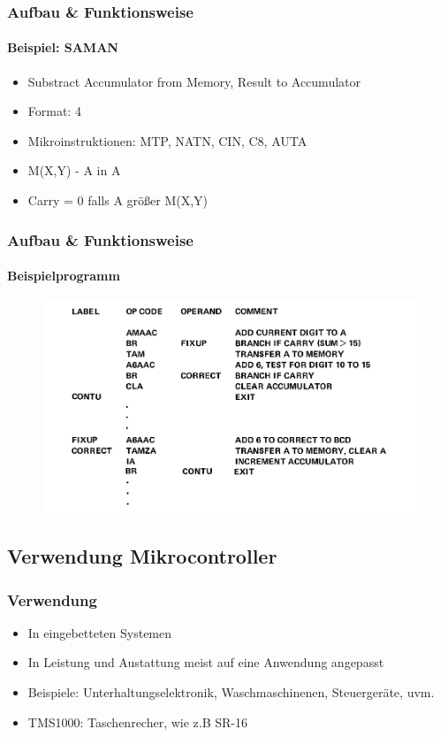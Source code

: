 \begin{frame}
\frametitle{Aufbau \& Funktionsweise}
	\framesubtitle{Beispiel: SAMAN}
		\begin{itemize}
			\item Substract Accumulator from Memory, Result to Accumulator \pause
			\item Format: 4 \pause
			\item Mikroinstruktionen: MTP, NATN, CIN, C8, AUTA \pause
			\item M(X,Y) - A in A \pause
			\item Carry = 0 falls A gr{\"o}{\ss}er M(X,Y)
		\end{itemize}
\end{frame}

\begin{frame}
\frametitle{Aufbau \& Funktionsweise}
	\framesubtitle{Beispielprogramm}
		\begin{figure}
			\centering
				\includegraphics[scale=0.3]{images/BSPProg.PNG}
		\end{figure}
\end{frame}

\subsection{Verwendung Mikrocontroller}
\begin{frame}
	\frametitle{Verwendung}
		\begin{itemize}
			\item In eingebetteten Systemen \pause
			\item In Leistung und Austattung meist auf eine Anwendung angepasst \pause
			\item Beispiele: Unterhaltungselektronik, Waschmaschinenen, Steuerger{\"a}te, uvm. \pause
			\item TMS1000: Taschenrecher, wie z.B SR-16
		\end{itemize}
\end{frame}

